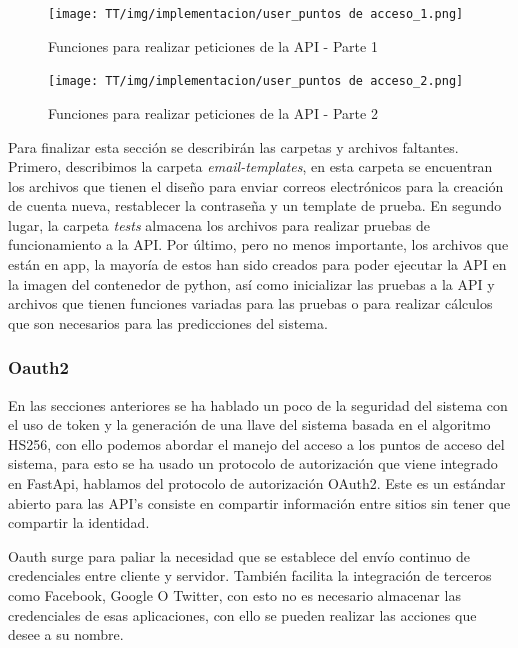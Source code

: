 \begin{figure}[!htb]
    \centering
    \texttt{[image: TT/img/implementacion/user\_puntos de acceso\_1.png]}
    \caption{Funciones para realizar peticiones de la API - Parte 1}
    \label{graphic:user_puntos de acceso_1}    
\end{figure}

\begin{figure}[!htb]
    \centering
    \texttt{[image: TT/img/implementacion/user\_puntos de acceso\_2.png]}
    \caption{Funciones para realizar peticiones de la API - Parte 2}
    \label{graphic:user_puntos de acceso_2}    
\end{figure}

Para finalizar esta sección se describirán las carpetas y archivos faltantes. Primero, describimos la carpeta \textit{email-templates}, en esta carpeta se encuentran los archivos que tienen el diseño para enviar correos electrónicos para la creación de cuenta nueva, restablecer la contraseña y un template de prueba. En segundo lugar, la carpeta \textit{tests} almacena los archivos para realizar pruebas de funcionamiento a la API. Por último, pero no menos importante, los archivos que están en app, la mayoría de estos han sido creados para poder ejecutar la API en la imagen del contenedor de python, así como inicializar las pruebas a la API y archivos que tienen funciones variadas para las pruebas o para realizar cálculos que son necesarios para las predicciones del sistema.

\clearpage
\subsubsection{Oauth2}
En las secciones anteriores se ha hablado un poco de la seguridad del sistema con el uso de token y la generación de una llave del sistema basada en el algoritmo HS256, con ello podemos abordar el manejo del acceso a los puntos de acceso del sistema, para esto se ha usado un protocolo de autorización que viene integrado en FastApi, hablamos del protocolo de autorización OAuth2. Este es un estándar abierto para las API's consiste en compartir información entre sitios sin tener que compartir la identidad.

Oauth surge para paliar la necesidad que se establece del envío continuo de credenciales entre cliente y servidor. También facilita la integración de terceros como Facebook, Google O Twitter, con esto no es necesario almacenar las credenciales de esas aplicaciones, con ello se pueden realizar las acciones que desee a su nombre.

